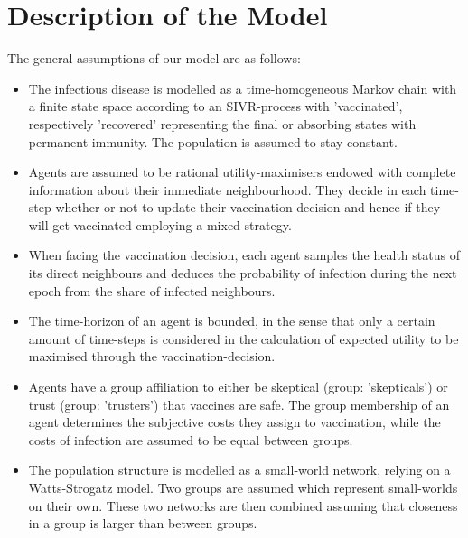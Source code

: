 \documentclass[11pt]{article}
\begin{document}
\section{Description of the Model}
\label{sec:DM}
The general assumptions of our model are as follows:
\begin{itemize}
\item{The infectious disease is modelled as a time-homogeneous Markov chain with a finite state space according to an SIVR-process with 'vaccinated', respectively 'recovered' representing the final or absorbing states with permanent immunity. The population is assumed to stay constant.}
\item{Agents are assumed to be rational utility-maximisers endowed with complete information about their immediate neighbourhood. They decide in each time-step whether or not to update their vaccination decision and hence if they will get vaccinated employing a mixed strategy.}
\item{When facing the vaccination decision, each agent samples the health status of its direct neighbours and deduces the probability of infection during the next epoch from the share of infected neighbours.}
\item{The time-horizon of an agent is bounded, in the sense that only a certain amount of time-steps is considered in the calculation of expected utility to be maximised through the vaccination-decision.}
\item{Agents have a group affiliation to either be skeptical (group: 'skepticals') or trust (group: 'trusters') that vaccines are safe. The group membership of an agent determines the subjective costs they assign to vaccination, while the costs of infection are assumed to be equal between groups.}
\item{The population structure is modelled as a small-world network, relying on a Watts-Strogatz model. Two groups are assumed which represent small-worlds on their own. These two networks are then combined assuming that closeness in a group is larger than between groups.}
\end{itemize}
\end{document}
